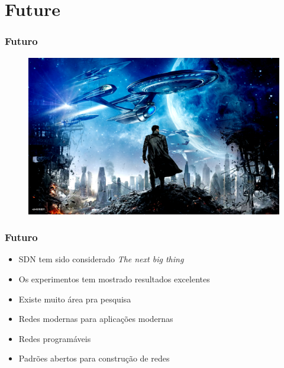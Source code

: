 \section{Future}

%
%
\begin{frame}\frametitle{Futuro}
    \begin{figure}[h]\hspace*{-0.5cm}
        \centering
        \includegraphics[scale=0.3]{images/future.png}
    \end{figure}
\end{frame}


%
%
\begin{frame}\frametitle{Futuro}
    \begin{itemize}
    \item SDN tem sido considerado \emph{The next big thing}
    \item Os experimentos tem mostrado resultados excelentes
    \item Existe muito área pra pesquisa
    \item Redes modernas para aplicações modernas
    \item Redes programáveis 
    \item Padrões abertos para construção de redes
    \end{itemize}
\end{frame}